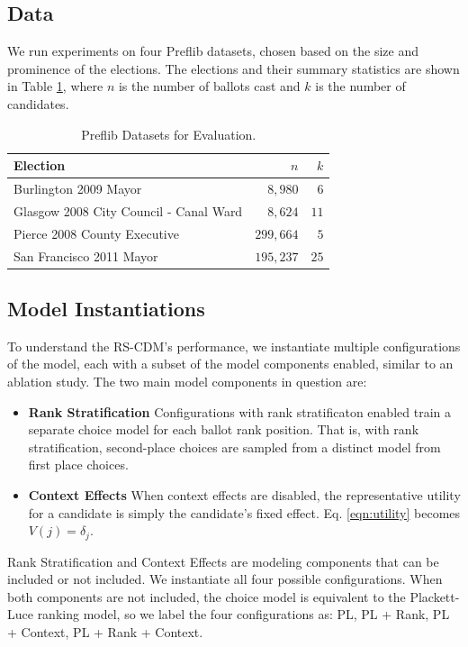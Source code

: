 \documentclass{article}
\begin{document}
\subsection{Data}
We run experiments on four Preflib datasets, chosen based on the size and prominence of the elections. The elections and their summary statistics are shown in Table \ref{tab:datasets}, where $n$ is the number of ballots cast and $k$ is the number of candidates.
\begin{table}[]
    \centering
    \caption{Preflib Datasets for Evaluation.}
    \begin{tabular}{lrr}
         \toprule
         Election & $n$ & $k$  \\ \midrule
         Burlington 2009 Mayor & $8,980$ & $6$ \\
         Glasgow 2008 City Council - Canal Ward & $8,624$ & $11$\\
         Pierce 2008 County Executive & $299,664$ & $5$ \\
         San Francisco 2011 Mayor & $195,237$ & $25$\\ \bottomrule
    \end{tabular}
    \label{tab:datasets}
\end{table}

\subsection{Model Instantiations}
To understand the RS-CDM's performance, we instantiate multiple configurations of the model, each with a subset of the model components enabled, similar to an ablation study. The two main model components in question are: 
\begin{itemize}
    \item \textbf{Rank Stratification} Configurations with rank stratificaton enabled train a separate choice model for each ballot rank position. That is, with rank stratification, second-place choices are sampled from a distinct model from first place choices.
    \item \textbf{Context Effects} When context effects are disabled, the representative utility for a candidate is simply the candidate's fixed effect. Eq. \eqref{eqn:utility} becomes $V(j) = \delta_j$.
\end{itemize}

Rank Stratification and Context Effects are modeling components that can be included or not included. We instantiate all four possible configurations. When both components are not included, the choice model is equivalent to the Plackett-Luce ranking model, so we label the four configurations as: PL, PL + Rank, PL + Context, PL + Rank + Context. 
\end{document}
